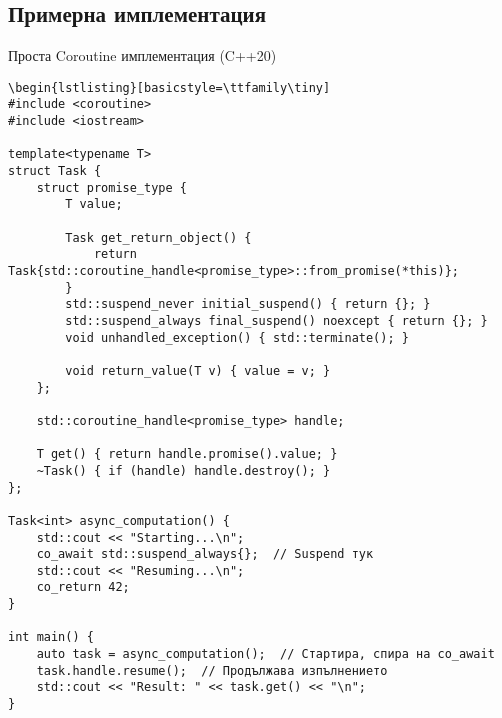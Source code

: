 \documentclass[aspectratio=169]{beamer}
\begin{document}
\subsection{Примерна имплементация}

\begin{frame}[fragile]{Проста Coroutine имплементация (C++20)}
\begin{lstlisting}[basicstyle=\ttfamily\tiny]
\begin{lstlisting}[basicstyle=\ttfamily\tiny]
#include <coroutine>
#include <iostream>

template<typename T>
struct Task {
    struct promise_type {
        T value;
        
        Task get_return_object() {
            return Task{std::coroutine_handle<promise_type>::from_promise(*this)};
        }
        std::suspend_never initial_suspend() { return {}; }
        std::suspend_always final_suspend() noexcept { return {}; }
        void unhandled_exception() { std::terminate(); }
        
        void return_value(T v) { value = v; }
    };
    
    std::coroutine_handle<promise_type> handle;
    
    T get() { return handle.promise().value; }
    ~Task() { if (handle) handle.destroy(); }
};

Task<int> async_computation() {
    std::cout << "Starting...\n";
    co_await std::suspend_always{};  // Suspend тук
    std::cout << "Resuming...\n";
    co_return 42;
}

int main() {
    auto task = async_computation();  // Стартира, спира на co_await
    task.handle.resume();  // Продължава изпълнението
    std::cout << "Result: " << task.get() << "\n";
}
\end{lstlisting}
\end{frame}
\end{document}
